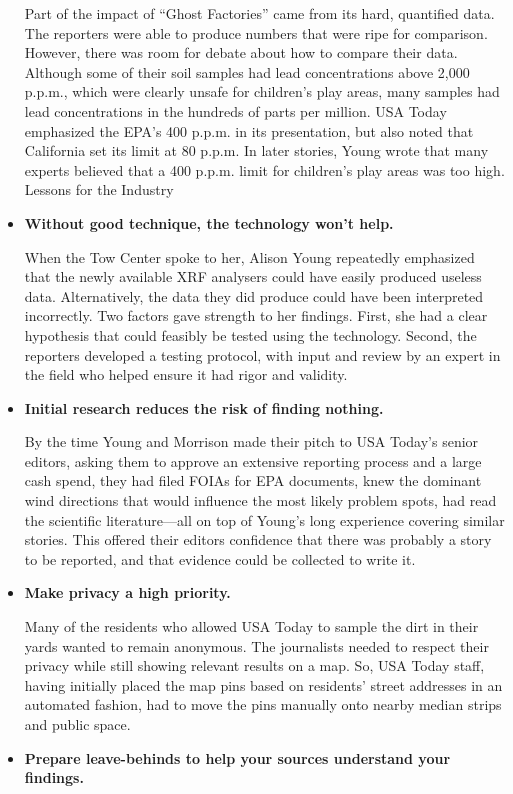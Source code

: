 \begin{itemize}
Part of the impact of ``Ghost Factories'' came from its hard, quantified
data. The reporters were able to produce numbers that were ripe for
comparison. However, there was room for debate about how to compare
their data. Although some of their soil samples had lead concentrations
above 2,000 p.p.m., which were clearly unsafe for children's
play areas, many samples had lead concentrations in the hundreds of
parts per million. USA Today emphasized the EPA's 400 p.p.m. in its
presentation, but also noted that California set its limit at 80 p.p.m.
In later stories, Young wrote that many experts believed that a 400
p.p.m. limit for children's play areas was too high.
Lessons for the Industry
\item \textbf{Without good technique, the technology won't help.}

When the Tow Center spoke to her, Alison Young repeatedly emphasized
that the newly available XRF analysers could have easily produced
useless data. Alternatively, the data they did produce could
have been interpreted incorrectly. Two factors gave strength to her
findings. First, she had a clear hypothesis that could feasibly be tested
using the technology. Second, the reporters developed a testing protocol,
with input and review by an expert in the field who helped
ensure it had rigor and validity.
\item \textbf{Initial research reduces the risk of finding nothing.}

By the time Young and Morrison made their pitch to USA Today's
senior editors, asking them to approve an extensive reporting process
and a large cash spend, they had filed FOIAs for EPA documents,
knew the dominant wind directions that would influence the most
likely problem spots, had read the scientific literature—all on top of
Young's long experience covering similar stories. This offered their
editors confidence that there was probably a story to be reported, and
that evidence could be collected to write it.
\item \textbf{Make privacy a high priority.}

Many of the residents who allowed USA Today to sample the dirt in
their yards wanted to remain anonymous. The journalists needed to
respect their privacy while still showing relevant results on a map. So,
USA Today staff, having initially placed the map pins based on residents'
street addresses in an automated fashion, had to move the pins
manually onto nearby median strips and public space.
\item \textbf{Prepare leave-behinds to help your sources understand
your findings.}


\end{itemize}
